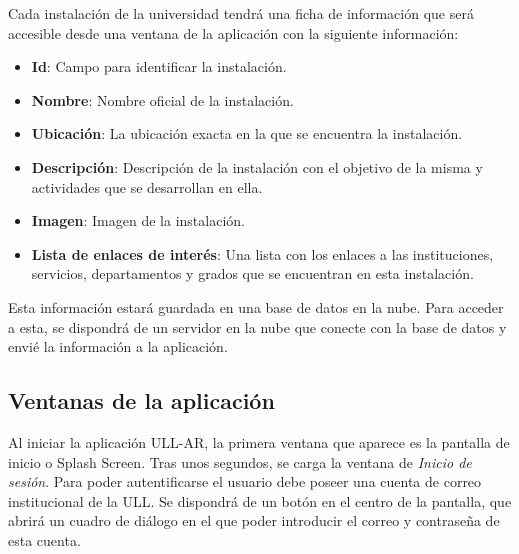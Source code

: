 Cada instalación de la universidad tendrá una ficha de información que será accesible desde una ventana de la aplicación con la siguiente información:

\begin{itemize}
    \item \textbf{Id}: Campo para identificar la instalación.
    \item \textbf{Nombre}: Nombre oficial de la instalación.
    \item \textbf{Ubicación}: La ubicación exacta en la que se encuentra la instalación. 
    \item \textbf{Descripción}: Descripción de la instalación con el objetivo de la misma y actividades que se desarrollan en ella.
    \item \textbf{Imagen}: Imagen de la instalación.
    \item \textbf{Lista de enlaces de interés}: Una lista con los enlaces a las instituciones, servicios, departamentos y grados que se encuentran en esta instalación.
\end{itemize}

Esta información estará guardada en una base de datos en la nube. Para acceder a esta, se dispondrá de un servidor en la nube que conecte con la base de datos y envié la información a la aplicación.

\subsection{Ventanas de la aplicación}

 

  
Al iniciar la aplicación ULL-AR, la primera ventana que aparece es la pantalla de inicio o Splash Screen. Tras unos segundos, se carga la ventana de \textit{Inicio de sesión}. Para poder autentificarse el usuario debe poseer una cuenta de correo institucional de la ULL. Se dispondrá de un botón en el centro de la pantalla, que abrirá un cuadro de diálogo en el que poder introducir el correo y contraseña de esta cuenta.
  
